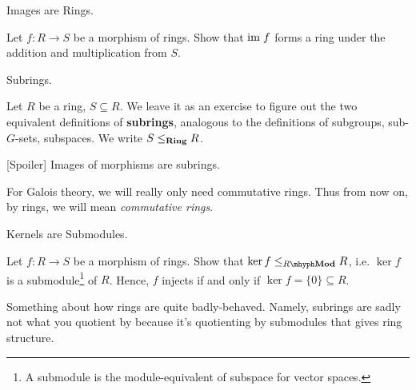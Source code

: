 \documentclass[../../book.tex]{subfiles}
\begin{document}
\begin{ex} [Important] Images are Rings. 

    Let $f : R \to S$ be a morphism of rings. 
    Show that $\textnormal{im}\; f$ forms a ring under the addition and multiplication from $S$. 
\end{ex}

\begin{dfn} Subrings. 

    Let $R$ be a ring, $S \subseteq R$. 
    We leave it as an exercise to figure out the two equivalent definitions
    of \textbf{subrings}, analogous to 
    the definitions of subgroups, sub-$G$-sets, subspaces. 
    We write $S \leq_{\mathbf{Ring}} R$.
    
    [Spoiler] Images of morphisms are subrings. 
\end{dfn}

\begin{rmk}
    For Galois theory, we will really only need commutative rings. 
    Thus from now on, by rings, we will mean \emph{commutative rings}. 
\end{rmk}

\begin{ex} [Important] Kernels are Submodules.

    Let $f : R \to S$ be a morphism of rings. 
    Show that $\ker f \leq_{\RMod} R$, i.e. 
    $\ker f$ is a submodule\footnote{
    A submodule is the module-equivalent of subspace for vector spaces.} of $R$.
    Hence, $f$ injects if and only if $\ker f = \{0\} \subseteq R$.  
\end{ex}

\begin{rmk} 
    Something about how rings are quite badly-behaved.
    Namely, subrings are sadly not what you quotient by
    because it's quotienting by submodules that gives ring structure. 
\end{rmk}
\end{document}

